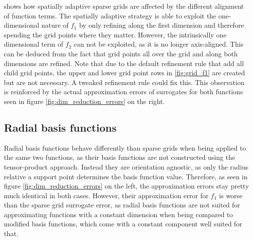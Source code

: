 \documentclass[
  a4paper,  %
  twoside,  %
  bibliography=totoc,
  headsepline,
  cleardoublepage=empty,
  parskip=half,
  draft=false
]{scrbook}
\begin{document}
\begin{mdframed}[style=style]
\begin{figure}[H]
\begin{subfigure}{.5\textwidth}
  \label{fig:grid_f2}
\end{subfigure}
\vspace{2.5mm}
\delimit
{}
\label{fig:grids}
\end{figure}
\end{mdframed}

 shows how spatially adaptive sparse grids are affected by the different alignment of function terms.
The spatially adaptive strategy is able to exploit the one-dimensional nature of $f_1$ by only refining along the first dimension and therefore spending the grid points where they matter.
However, the intrinsically one dimensional term of $f_2$ can not be exploited, as it is no longer axis-aligned.
This can be deduced from the fact that grid points all over the grid and along both dimensions are refined.
Note that due to the default refinement rule that add all child grid points, the upper and lower grid point rows in \cref{fig:grid_f1} are created but are not necessary.
A tweaked refinement rule could fix this.
This observation is reinforced by the actual approximation errors of surrogates for both functions seen in figure \cref{fig:dim_reduction_errors} on the right.

\subsection{Radial basis functions}

Radial basis functions behave differently than sparse grids when being applied to the same two functions, as their basis functions are not constructed using the tensor-product approach.
Instead they are orientation agnostic, as only the radius relative a support point determines the basis function value.
Therefore, as seen in figure \cref{fig:dim_reduction_errors} on the left, the approximation errors stay pretty much identical in both cases.
However, their approximation error for $f_1$ is worse than the sparse grid surrogate error, as radial basis functions are not suited for approximating functions with a constant dimension when being compared to modified basis functions, which come with a constant component well suited for that.
\end{document}

